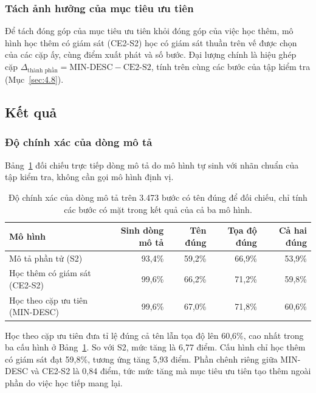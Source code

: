 \subsubsection{Tách ảnh hưởng của mục tiêu ưu tiên}

Để tách đóng góp của mục tiêu ưu tiên khỏi đóng góp của việc học thêm, mô hình học thêm có giám sát (CE2-S2) học có giám sát thuần trên vế được chọn của các cặp ấy, cùng điểm xuất phát và số bước. Đại lượng chính là hiệu ghép cặp $\Delta_{\text{thành phần}} = \text{MIN-DESC} - \text{CE2-S2}$, tính trên cùng các bước của tập kiểm tra (Mục~\ref{sec:4.8}).

\subsection{Kết quả}\label{sec:A.2.2}

\subsubsection{Độ chính xác của dòng mô tả}\label{sec:A.2.2.1}

Bảng~\ref{tab:A.4} đối chiếu trực tiếp dòng mô tả do mô hình tự sinh với nhãn chuẩn của tập kiểm tra, không cần gọi mô hình định vị.

\begin{table}[htbp]
\centering\small
\caption{Độ chính xác của dòng mô tả trên 3.473 bước có tên đúng để đối chiếu, chỉ tính các bước có mặt trong kết quả của cả ba mô hình.}\label{tab:A.4}
\setlength{\tabcolsep}{4pt}
\begin{tabularx}{\textwidth}{@{}>{\raggedright\arraybackslash\hsize=1.00\hsize}Xrrrr@{}}
\toprule
\textbf{Mô hình} & \textbf{Sinh dòng mô tả} & \textbf{Tên đúng} & \textbf{Tọa độ đúng} & \textbf{Cả hai đúng} \\
\midrule
Mô tả phần tử (S2) & 93,4\% & 59,2\% & 66,9\% & 53,9\% \\
Học thêm có giám sát (CE2-S2) & 99,6\% & 66,2\% & 71,2\% & 59,8\% \\
Học theo cặp ưu tiên (MIN-DESC) & 99,6\% & 67,0\% & 71,8\% & 60,6\% \\
\bottomrule
\end{tabularx}
\end{table}

Học theo cặp ưu tiên đưa tỉ lệ đúng cả tên lẫn tọa độ lên 60,6\%, cao nhất trong ba cấu hình ở Bảng~\ref{tab:A.4}. So với S2, mức tăng là 6,77 điểm. Cấu hình chỉ học thêm có giám sát đạt 59,8\%, tương ứng tăng 5,93 điểm. Phần chênh riêng giữa MIN-DESC và CE2-S2 là 0,84 điểm, tức mức tăng mà mục tiêu ưu tiên tạo thêm ngoài phần do việc học tiếp mang lại.

